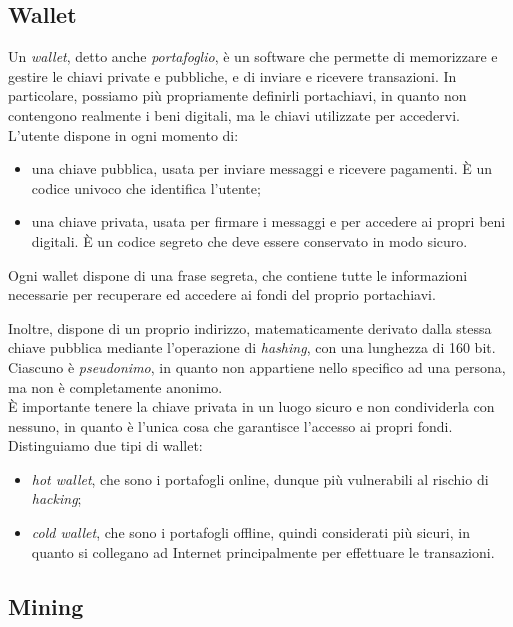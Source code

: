 \subsection{Wallet}\label{sec:tecnologie-blockchain-wallet}

Un \textit{wallet}, detto anche \textit{portafoglio}, è un software che permette di memorizzare e gestire le chiavi private e pubbliche, e di inviare e ricevere transazioni.
In particolare, possiamo più propriamente definirli portachiavi, in quanto non contengono realmente i beni digitali, ma le chiavi utilizzate per accedervi.
L'utente dispone in ogni momento di:
\begin{itemize}
    \item una chiave pubblica, usata per inviare messaggi e ricevere pagamenti. È un codice univoco che identifica l'utente;
    \item una chiave privata, usata per firmare i messaggi e per accedere ai propri beni digitali. È un codice segreto che deve essere conservato in modo sicuro.
\end{itemize} 

Ogni wallet dispone di una frase segreta, che contiene tutte le informazioni necessarie per recuperare ed accedere ai fondi del proprio portachiavi.

Inoltre, dispone di un proprio indirizzo, matematicamente derivato dalla stessa chiave pubblica mediante l'operazione di \textit{hashing}, con una lunghezza di 160 bit.
Ciascuno è \textit{pseudonimo}, in quanto non appartiene nello specifico ad una persona, ma non è completamente anonimo. \\
È importante tenere la chiave privata in un luogo sicuro e non condividerla con nessuno, in quanto è l'unica cosa che garantisce l'accesso ai propri fondi.
Distinguiamo due tipi di wallet:
\begin{itemize}
    \item \textit{hot wallet}, che sono i portafogli online, dunque più vulnerabili al rischio di \textit{hacking};
    \item \textit{cold wallet}, che sono i portafogli offline, quindi considerati più sicuri, in quanto si collegano ad Internet principalmente per effettuare le transazioni.
\end{itemize}

\subsection{Mining}\label{sec:tecnologie-blockchain-mining}

